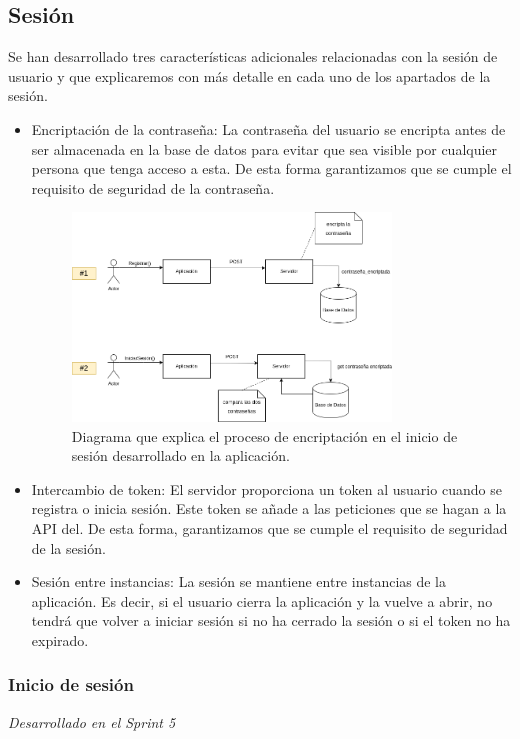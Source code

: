 \subsection{Sesión}
\label{sec:sesion}
Se han desarrollado tres características adicionales relacionadas con la sesión de usuario y que explicaremos con más detalle en cada uno de los apartados de la sesión.
\begin{itemize}
    \item Encriptación de la contraseña: La contraseña del usuario se encripta antes de ser almacenada en la base de datos para evitar que sea visible por cualquier persona que tenga acceso a esta. De esta forma
    garantizamos que se cumple el requisito de seguridad de la contraseña.
    \begin{figure}[H]
      \centering
      \includegraphics[width=0.8\textwidth]{imagenes/c7/logindiag.png}
      \caption{Diagrama que explica el proceso de encriptación en el inicio de sesión desarrollado en la aplicación.}
      \label{fig:login}
    \end{figure}

    \item Intercambio de token: El servidor proporciona un token al usuario cuando se registra o inicia sesión. Este token se añade a las peticiones que se hagan a la API del. De esta forma, garantizamos que se cumple el requisito de seguridad de la sesión.
    \item Sesión entre instancias: La sesión se mantiene entre instancias de la aplicación. Es decir, si el usuario cierra la aplicación y la vuelve a abrir, no tendrá que volver a iniciar sesión si no ha cerrado la sesión o si el token no ha expirado.
\end{itemize}

\subsubsection{Inicio de sesión}
\textit{Desarrollado en el Sprint 5}

